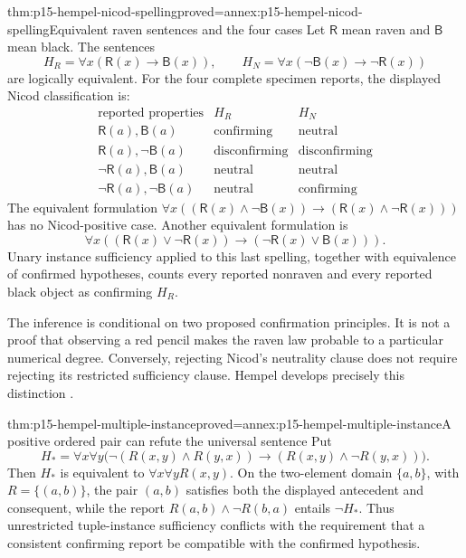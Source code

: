 \begin{hbtheorem}{thm:p15-hempel-nicod-spelling}{proved=annex:p15-hempel-nicod-spelling}{Equivalent raven sentences and the four cases}
Let $\mathsf R$ mean raven and $\mathsf B$ mean black. The sentences
\[
 H_R=\forall x(\mathsf R(x)\to\mathsf B(x)),\qquad
 H_N=\forall x(\neg\mathsf B(x)\to\neg\mathsf R(x))
\]
are logically equivalent. For the four complete specimen reports, the
displayed Nicod classification is:
\[
\begin{array}{c|cc}
 \text{reported properties}&H_R&H_N\\\hline
 \mathsf R(a),\mathsf B(a)&\text{confirming}&\text{neutral}\\
 \mathsf R(a),\neg\mathsf B(a)&\text{disconfirming}&\text{disconfirming}\\
 \neg\mathsf R(a),\mathsf B(a)&\text{neutral}&\text{neutral}\\
 \neg\mathsf R(a),\neg\mathsf B(a)&\text{neutral}&\text{confirming}
\end{array}
\]
The equivalent formulation
$\forall x((\mathsf R(x)\land\neg\mathsf B(x))\to
(\mathsf R(x)\land\neg\mathsf R(x)))$ has no Nicod-positive case.
Another equivalent formulation is
\[
 \forall x((\mathsf R(x)\lor\neg\mathsf R(x))\to
                       (\neg\mathsf R(x)\lor\mathsf B(x))).
\]
Unary instance sufficiency applied to this last spelling, together with
equivalence of confirmed hypotheses, counts every reported nonraven and
every reported black object as confirming $H_R$.
\end{hbtheorem}

The inference is conditional on two proposed confirmation principles. It
is not a proof that observing a red pencil makes the raven law probable
to a particular numerical degree. Conversely, rejecting Nicod's neutrality
clause does not require rejecting its restricted sufficiency clause.
Hempel develops precisely this distinction
\parencite[I, \S\S3--5, pp.~9--15]{Hempel1945ConfirmationI}.

\begin{hbtheorem}{thm:p15-hempel-multiple-instance}{proved=annex:p15-hempel-multiple-instance}{A positive ordered pair can refute the universal sentence}
Put
\[
 H_*=\forall x\forall y\bigl(
 \neg(R(x,y)\land R(y,x))\to(R(x,y)\land\neg R(y,x))\bigr).
\]
Then $H_*$ is equivalent to $\forall x\forall y R(x,y)$.
On the two-element domain $\{a,b\}$, with $R=\{(a,b)\}$, the pair
$(a,b)$ satisfies both the displayed antecedent and consequent, while the
report $R(a,b)\land\neg R(b,a)$ entails $\neg H_*$. Thus unrestricted
tuple-instance sufficiency conflicts with the requirement that a consistent
confirming report be compatible with the confirmed hypothesis.
\end{hbtheorem}

